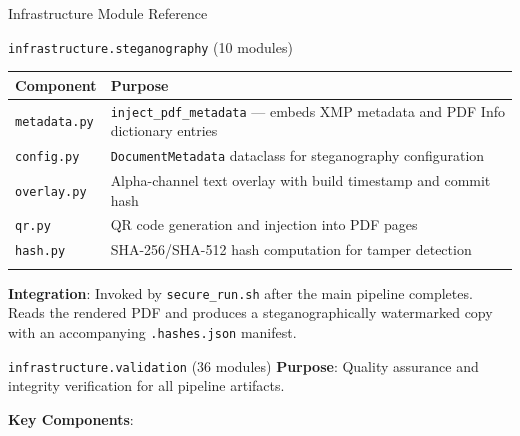 \documentclass[
  ignorenonframetext,
]{beamer}
\newcounter{none} %
\begin{document}
\begin{frame}[fragile]{Infrastructure Module Reference}
\begin{block}{\texttt{infrastructure.steganography} (10 modules)}
{\def\LTcaptype{none} %
\begin{longtable}[]{@{}
  >{\raggedright\arraybackslash}p{}
  >{\raggedright\arraybackslash}p{}@{}}
\toprule\noalign{}
\begin{minipage}[b]{\linewidth}\raggedright
Component
\end{minipage} & \begin{minipage}[b]{\linewidth}\raggedright
Purpose
\end{minipage} \\
\midrule\noalign{}
\endhead
\texttt{metadata.py} & \texttt{inject\_pdf\_metadata} --- embeds XMP
metadata and PDF Info dictionary entries \\
\texttt{config.py} & \texttt{DocumentMetadata} dataclass for
steganography configuration \\
\texttt{overlay.py} & Alpha-channel text overlay with build timestamp
and commit hash \\
\texttt{qr.py} & QR code generation and injection into PDF pages \\
\texttt{hash.py} & SHA-256/SHA-512 hash computation for tamper
detection \\
\bottomrule\noalign{}
\end{longtable}
}

\textbf{Integration}: Invoked by \texttt{secure\_run.sh} after the main
pipeline completes. Reads the rendered PDF and produces a
steganographically watermarked copy with an accompanying
\texttt{.hashes.json} manifest.
\end{block}

\begin{block}{\texttt{infrastructure.validation} (36 modules)}
\protect{}\label{infrastructure.validation-36-modules}
\textbf{Purpose}: Quality assurance and integrity verification for all
pipeline artifacts.

\textbf{Key Components}:


\end{block}
\end{frame}
\end{document}
